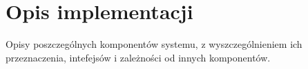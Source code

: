 \chapter{Opis implementacji}
\label{cha:implementacja}

Opisy poszczególnych komponentów systemu, z wyszczególnieniem ich przeznaczenia, intefejsów i zależności od innych komponentów.

